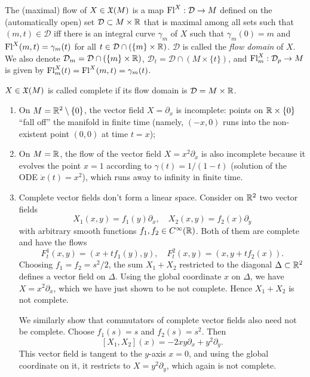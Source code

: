 \begin{defn}[Flow]
The (maximal) flow of $X\in\mathfrak{X}(M)$ is a map $\mathrm{Fl}^X:\mathcal{D}\to M$ defined on the (automatically open) set $\mathcal{D}\subset M\times \mathbb{R} $ that is maximal among all sets such that $(m,t)\in \mathcal{D}$ iff there is an integral curve $\gamma_m$ of $X$ such that $\gamma_m(0)=m$ and $\mathrm{Fl}^X(m,t)=\gamma_m(t)$ for all $t\in\mathcal{D}\cap (\{m\}\times\mathbb{R} )$. $\mathcal{D}$ is called the \emph{flow domain} of $X$. We also denote $\mathcal{D}_m=\mathcal{D}\cap (\{m\}\times\mathbb{R} )$, $\mathcal{D}_t=\mathcal{D}\cap (M\times\{t\})$, and $\mathrm{Fl}^X_m:\mathcal{D}_p\to M$ is given by $\mathrm{Fl}^X_m(t)=\mathrm{Fl}^X(m,t)=\gamma_m(t)$.
\end{defn}



\begin{defn}
    $X\in\mathfrak{X}(M)$ is called complete if its flow domain is $\mathcal{D}=M\times\mathbb{R} $. 
\end{defn}
\begin{example}
\begin{enumerate}
    \item On $M=\mathbb{R}^2\setminus\{0\}$, the vector field $X=\partial_x$ is incomplete: points on $\mathbb{R} \times\{0\}$ ``fall off'' the manifold in finite time (namely, $(-x,0)$ runs into the non-existent point $(0,0)$ at time $t=x$);
    \item On $M=\mathbb{R} $, the flow of the vector field $X=x^2\partial_x$ is also incomplete because it evolves the point $x=1$ according to $\gamma(t)=1/(1-t)$ (solution of the ODE $\dot x(t)=x^2$), which runs away to infinity in finite time.
    \item Complete vector fields don't form a linear space. Consider on $\mathbb{R}^2$ two vector fields
    \[X_1(x,y)=f_1(y)\partial_x, \quad X_2(x,y)=f_2(x)\partial_y\]
    with arbitrary smooth functions $f_1,f_2\in C^\infty(\mathbb{R})$. Both of them are complete and have the flows
    \[F^1_t(x,y)=(x+tf_1(y),y),\quad F^2_t(x,y)=(x,y+tf_2(x)).\]
    Choosing $f_1=f_2=s^2/2$, the sum $X_1+X_2$ restricted to the diagonal $\Delta\subset \mathbb{R}^2$ defines a vector field on $\Delta$. Using the global coordinate $x$ on $\Delta$, we have $X=x^2\partial_x$, which we have just shown to be not complete. Hence $X_1+X_2$ is not complete.

    We similarly show that commutators of complete vector fields also need not be complete. Choose $f_1(s)=s$ and $f_2(s)=s^2$. Then
    \[[X_1,X_2](x)=-2xy\partial_x+y^2\partial_y.\]
    This vector field is tangent to the $y$-axis $x=0$, and using the global coordinate on it, it restricts to $X=y^2\partial_y$, which again is not complete.
\end{enumerate}
\end{example}



